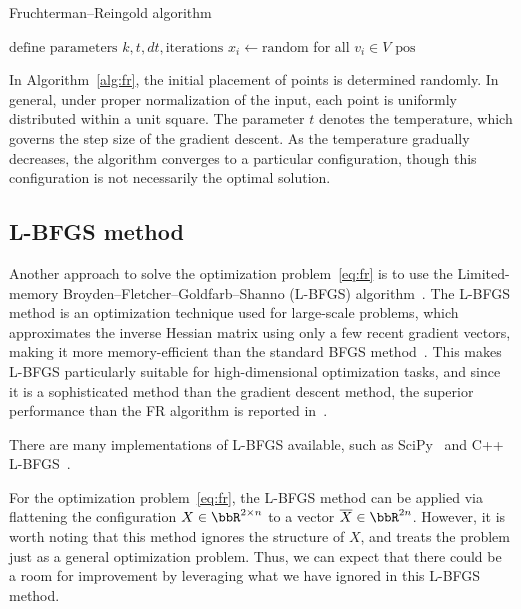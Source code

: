 \documentclass[dvipdfmx,journal]{IEEEtran}
\begin{document}
\begin{algorithm}[ht]
  \caption{Fruchterman--Reingold algorithm}
  \label{alg:fr}

  $\text{define parameters } k, t, dt, \text{iterations}$\;
  $x_i \gets \text{random}$ for all $v_i \in V$\;
  \Return $\text{pos}$
\end{algorithm}

In Algorithm~\ref{alg:fr}, the initial placement of points is determined randomly. In general, under proper normalization of the input, each point is uniformly distributed within a unit square.
The parameter $t$ denotes the temperature, which governs the step size of the gradient descent. As the temperature gradually decreases, the algorithm converges to a particular configuration, though this configuration is not necessarily the optimal solution.

\subsection{L-BFGS method}\label{ssec:lbfgs}

Another approach to solve the optimization problem~\eqref{eq:fr} is to use the Limited-memory Broyden--Fletcher--Goldfarb--Shanno (L-BFGS) algorithm~\cite{6183577}.
The L-BFGS method is an optimization technique used for large-scale problems, which approximates the inverse Hessian matrix using only a few recent gradient vectors, making it more memory-efficient than the standard BFGS method~\cite{liuLimitedMemoryBFGS1989}.
This makes L-BFGS particularly suitable for high-dimensional optimization tasks, and since it is a sophisticated method than the gradient descent method, the superior performance than the FR algorithm is reported in~\cite{6183577}.

There are many implementations of L-BFGS available, such as SciPy~\cite{2020SciPy-NMeth} and C++ L-BFGS~\cite{qiuYixuanLBFGSpp2024,okazakiChokkanLiblbfgs2024}.

For the optimization problem~\eqref{eq:fr}, the L-BFGS method can be applied via flattening the configuration $X \in \bbR^{2 \times n}$ to a vector $\overline{X} \in \bbR^{2n}$.
However, it is worth noting that this method ignores the structure of $X$, and treats the problem just as a general optimization problem. Thus, we can expect that there could be a room for improvement by leveraging what we have ignored in this L-BFGS method.
\end{document}
